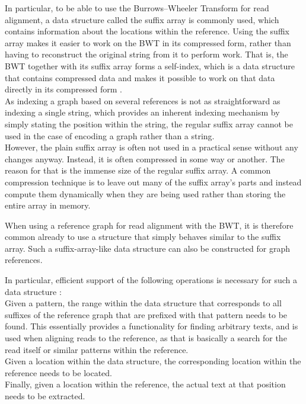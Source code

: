 \documentclass[a4paper,12pt,twoside,BCOR=10mm]{scrbook}
\begin{document}
In particular, to be able to use the Burrows--Wheeler Transform for read alignment, 
a data structure called the suffix array \citep{Puglisi2007} is commonly used, which contains 
information about the locations within the reference. 
Using the suffix array makes it easier to work on the BWT in its compressed form, 
rather than having to reconstruct the original string from it to perform work. 
That is, the BWT together with its suffix array forms a self-index, 
which is a data structure that contains compressed data and makes it possible 
to work on that data directly in its compressed form \citep{Navarro2007}. \\
As indexing a graph based on several references is not as straightforward as 
indexing a single string, which provides an inherent indexing mechanism by 
simply stating the position within the string, the regular suffix array cannot 
be used in the case of encoding a graph rather than a string. \\
However, the plain suffix array is often not used in a practical sense 
without any changes anyway. Instead, it is often compressed in some way or another. 
The reason for that is the immense size of the regular suffix array. 
A common compression technique is to leave out many of the suffix array's parts 
and instead compute them dynamically 
when they are being used rather than storing the entire array in memory. 

When using a reference graph for read alignment with the BWT, it is therefore common 
already to use a structure that simply behaves similar to the suffix array. 
Such a suffix-array-like data structure can also be constructed for graph references.

In particular, efficient support of the following operations is necessary for such a data structure \citep{Siren2014}: \\
Given a pattern, the range within the data structure 
that corresponds to all suffixes of the reference graph that are prefixed with that pattern needs to be found. 
This essentially provides a functionality for finding arbitrary texts, and is used when aligning reads to 
the reference, as that is basically a search for the read itself or similar patterns within the reference. \\
Given a location within the data structure, the corresponding location within the 
reference needs to be located. \\
Finally, given a location within the reference, the actual text at that position 
needs to be extracted.
\end{document}
